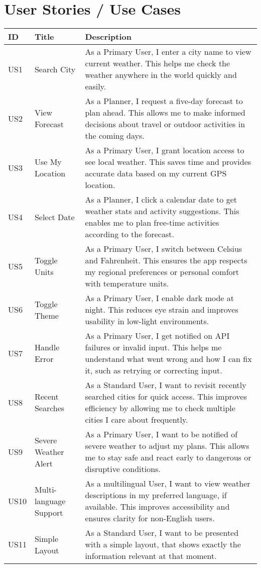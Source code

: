 \documentclass[fontsize=13pt,a4paper]{scrartcl}
\begin{document}
\newpage

\section{User Stories / Use Cases}
\begin{longtable}{|p{1cm}|p{3cm}|p{10cm}|}
\hline
\textbf{ID} & \textbf{Title} & \textbf{Description} \\
\hline
US1 & Search City & As a Primary User, I enter a city name to view current weather. This helps me check the weather anywhere in the world quickly and easily. \\
\hline
US2 & View Forecast & As a Planner, I request a five-day forecast to plan ahead. This allows me to make informed decisions about travel or outdoor activities in the coming days. \\
\hline
US3 & Use My Location & As a Primary User, I grant location access to see local weather. This saves time and provides accurate data based on my current GPS location. \\
\hline
US4 & Select Date & As a Planner, I click a calendar date to get weather stats and activity suggestions. This enables me to plan free-time activities according to the forecast. \\
\hline
US5 & Toggle Units & As a Primary User, I switch between Celsius and Fahrenheit. This ensures the app respects my regional preferences or personal comfort with temperature units. \\
\hline
US6 & Toggle Theme & As a Primary User, I enable dark mode at night. This reduces eye strain and improves usability in low-light environments. \\
\hline
US7 & Handle Error & As a Primary User, I get notified on API failures or invalid input. This helps me understand what went wrong and how I can fix it, such as retrying or correcting input. \\
\hline
US8 & Recent Searches & As a Standard User, I want to revisit recently searched cities for quick access. This improves efficiency by allowing me to check multiple cities I care about frequently. \\
\hline
US9 & Severe Weather Alert & As a Primary User, I want to be notified of severe weather to adjust my plans. This allows me to stay safe and react early to dangerous or disruptive conditions. \\
\hline
US10 & Multi-language Support & As a multilingual User, I want to view weather descriptions in my preferred language, if available. This improves accessibility and ensures clarity for non-English users. \\
\hline
US11 & Simple Layout & As a Standard User, I want to be presented with a simple layout, that shows exactly the information relevant at that moment. \\
\hline
\end{longtable}
\end{document}
